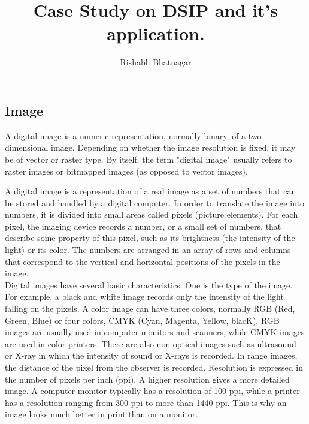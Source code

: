 \documentclass{article}
\newcommand{\addImage}[5]{
    \begin{figure}[#1]
        \centering
        \texttt{[image: \#3]}
        \caption{#4}
        \label{fig:#5}
    \end{figure}
}
\begin{document}
   \title{Case Study on DSIP and it's application.}                           
    \author{Rishabh Bhatnagar}
    \maketitle
    \tableofcontents
    \newpage

    \begin{multicols}{2}                %
		\section{Image}
			A digital image is a numeric representation, normally binary, of a 
			two-dimensional image. Depending on whether the image resolution is 
			fixed, it may be of vector or raster type. By itself, the term 
			"digital image" usually refers to raster images or bitmapped images 
			(as opposed to vector images). \cite{imageWiki}
			
			A digital image is a representation of a real image as a set of numbers that can be stored and handled by a digital computer. In order to translate the image into numbers, it is divided into small areas called pixels (picture elements). For each pixel, the imaging device records a number, or a small set of numbers, that describe some property of this pixel, such as its brightness (the intensity of the light) or its color. The numbers are arranged in an array of rows and columns that correspond to the vertical and horizontal positions of the pixels in the image. \cite{imageEncyclopedia} \\
			Digital images have several basic characteristics. One is the type of the image. For example, a black and white image records only the intensity of the light falling on the pixels. A color image can have three colors, normally RGB (Red, Green, Blue) or four colors, CMYK (Cyan, Magenta, Yellow, blacK). RGB images are usually used in computer monitors and scanners, while CMYK images are used in color printers. There are also non-optical images such as ultrasound or X-ray in which the intensity of sound or X-rays is recorded. In range images, the distance of the pixel from the observer is recorded. Resolution is expressed in the number of pixels per inch (ppi). A higher resolution gives a more detailed image. A computer monitor typically has a resolution of 100 ppi, while a printer has a resolution ranging from 300 ppi to more than 1440 ppi. This is why an image looks much better in print than on a monitor. \cite{imageEncyclopedia}
        

\end{multicols}
\end{document}
